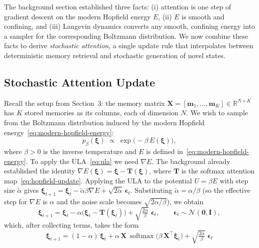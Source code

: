 
The background section established three facts: (i) attention is one step of gradient descent on the modern Hopfield energy $E$, (ii) $E$ is smooth and confining, and (iii) Langevin dynamics converts any smooth, confining energy into a sampler for the corresponding Boltzmann distribution. We now combine these facts to derive \emph{stochastic attention}, a single update rule that interpolates between deterministic memory retrieval and stochastic generation of novel states.

\subsection{Stochastic Attention Update}
Recall the setup from Section~3: the memory matrix $\mathbf{X}=[\mathbf{m}_1,\dots,\mathbf{m}_K]\in\mathbb{R}^{N\times K}$ has $K$ stored memories as its columns, each of dimension $N$. We wish to sample from the Boltzmann distribution induced by the modern Hopfield energy~\eqref{eq:modern-hopfield-energy}:
\begin{equation}\label{eq:boltzmann-hopfield}
    p_\beta(\boldsymbol{\xi})
    \;\propto\; \exp\!\bigl(-\beta\, E(\boldsymbol{\xi})\bigr),
\end{equation}
where $\beta>0$ is the inverse temperature and $E$ is defined in~\eqref{eq:modern-hopfield-energy}. To apply the ULA~\eqref{eq:ula} we need $\nabla E$. The background already established the identity $\nabla E(\boldsymbol{\xi})=\boldsymbol{\xi}-\mathbf{T}(\boldsymbol{\xi})$, where $\mathbf{T}$ is the softmax attention map~\eqref{eq:hopfield-update}. Applying the ULA to the potential $U=\beta E$ with step size $\tilde\alpha$ gives $\boldsymbol{\xi}_{t+1}=\boldsymbol{\xi}_t-\tilde\alpha\beta\nabla E+\sqrt{2\tilde\alpha}\,\boldsymbol{\epsilon}_t$. Substituting $\tilde\alpha=\alpha/\beta$ (so the effective step for $\nabla E$ is $\alpha$ and the noise scale becomes $\sqrt{2\alpha/\beta}$), we obtain
\begin{equation}\label{eq:stochastic-attention}
    \boldsymbol{\xi}_{t+1}
    = \boldsymbol{\xi}_t
      - \alpha\bigl(\boldsymbol{\xi}_t - \mathbf{T}(\boldsymbol{\xi}_t)\bigr)
      + \sqrt{\tfrac{2\alpha}{\beta}}\;\boldsymbol{\epsilon}_t,
    \qquad \boldsymbol{\epsilon}_t\sim\mathcal{N}(\mathbf{0},\mathbf{I}),
\end{equation}
which, after collecting terms, takes the form
\begin{equation}\label{eq:stochastic-attention-expanded}
    \boxed{\;
    \boldsymbol{\xi}_{t+1}
    = (1-\alpha)\,\boldsymbol{\xi}_t
      + \alpha\,\mathbf{X}\,\operatorname{softmax}\!\bigl(\beta\,\mathbf{X}^{\top}\boldsymbol{\xi}_t\bigr)
      + \sqrt{\tfrac{2\alpha}{\beta}}\;\boldsymbol{\epsilon}_t
    \;}
\end{equation}
